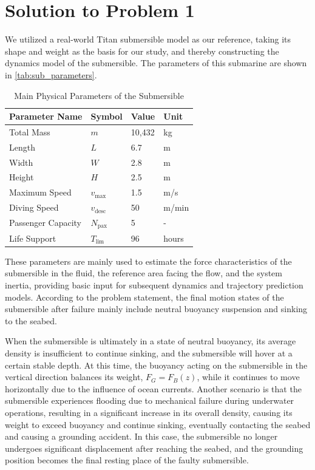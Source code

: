\documentclass{mcmthesis}
\begin{document}
\section{Solution to Problem 1}
We utilized a real-world Titan submersible model as our reference, taking its shape and weight as the basis for our study, and thereby constructing the dynamics model of the submersible.
The parameters of this submarine are shown in \autoref{tab:sub_parameters}.
\begin{table}[htbp]
\centering
\caption{Main Physical Parameters of the Submersible}
\vspace{-0.4cm} \label{tab:sub_parameters}
\begin{tabularx}{\linewidth}{XXXX}
\toprule
Parameter Name & Symbol & Value & Unit \\
\midrule
Total Mass & $m$ & 10,432 & kg \\
Length  & $L$ & 6.7 & m \\
Width  & $W$ & 2.8 & m \\
Height & $H$ & 2.5 & m \\
Maximum Speed & $v_{\max}$ & 1.5& m/s  \\
Diving Speed & $v_{\text{desc}}$ & 50 & m/min \\
Passenger Capacity & $N_{\text{pax}}$ & 5 & - \\
Life Support & $T_{\text{lim}}$ & 96 & hours  \\
\bottomrule
\end{tabularx}
\end{table}
These parameters are mainly used to estimate the force characteristics of the submersible in the fluid,
the reference area facing the flow, and the system inertia, providing basic input for subsequent dynamics and trajectory prediction models.
According to the problem statement, the final motion states of the submersible after failure mainly include
neutral buoyancy suspension and sinking to the seabed.

When the submersible is ultimately in a state of neutral buoyancy,
its average density is insufficient to continue sinking,
and the submersible will hover at a certain stable depth.
At this time, the buoyancy acting on the submersible in the vertical direction balances its weight,
$F_G=F_B(z)$, while it continues to move horizontally due to the influence of ocean currents.
Another scenario is that the submersible experiences flooding due to mechanical failure during underwater operations,
resulting in a significant increase in its overall density,
causing its weight to exceed buoyancy and continue sinking,
eventually contacting the seabed and causing a grounding accident.
In this case, the submersible no longer undergoes significant displacement after reaching the seabed,
and the grounding position becomes the final resting place of the faulty submersible.
\end{document}

